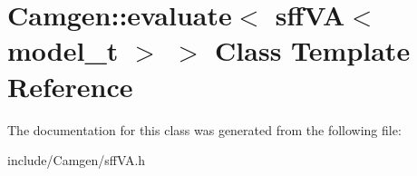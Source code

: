 \hypertarget{a00195}{}\section{Camgen\+:\+:evaluate$<$ sff\+V\+A$<$ model\+\_\+t $>$ $>$ Class Template Reference}
\label{a00195}


The documentation for this class was generated from the following file\+:\begin{DoxyCompactItemize}
\item 
include/\+Camgen/sff\+V\+A.\+h\end{DoxyCompactItemize}

